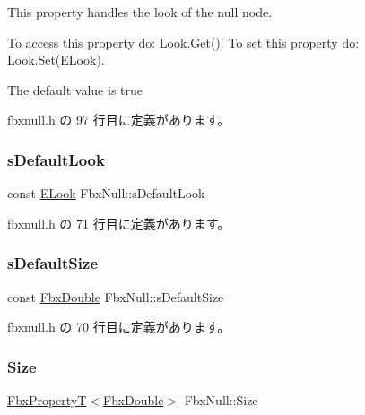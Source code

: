 This property handles the look of the null node.

To access this property do\+: Look.\+Get(). To set this property do\+: Look.\+Set(\+E\+Look).

The default value is true 

 fbxnull.\+h の 97 行目に定義があります。

\mbox{\label{class_fbx_null_a0945b3b81e8672f19f19445f593d6cca}} 
\subsubsection{\texorpdfstring{s\+Default\+Look}{sDefaultLook}}
{\footnotesize\ttfamily const \hyperlink{class_fbx_null_aa68cd0be1fca86a79ab603ee99505d78}{E\+Look} Fbx\+Null\+::s\+Default\+Look\hspace{0.3cm}{\ttfamily [static]}}



 fbxnull.\+h の 71 行目に定義があります。

\mbox{\label{class_fbx_null_a87d33c8990012bca2e52101ea02af9d5}} 
\subsubsection{\texorpdfstring{s\+Default\+Size}{sDefaultSize}}
{\footnotesize\ttfamily const \hyperlink{fbxtypes_8h_a171e72a1c46fc15c1a6c9c31948c1c5b}{Fbx\+Double} Fbx\+Null\+::s\+Default\+Size\hspace{0.3cm}{\ttfamily [static]}}



 fbxnull.\+h の 70 行目に定義があります。

\mbox{\label{class_fbx_null_a20a712e7191ecd9eb6570a4a50293a40}} 
\subsubsection{\texorpdfstring{Size}{Size}}
{\footnotesize\ttfamily \hyperlink{class_fbx_property_t}{Fbx\+PropertyT}$<$\hyperlink{fbxtypes_8h_a171e72a1c46fc15c1a6c9c31948c1c5b}{Fbx\+Double}$>$ Fbx\+Null\+::\+Size}

